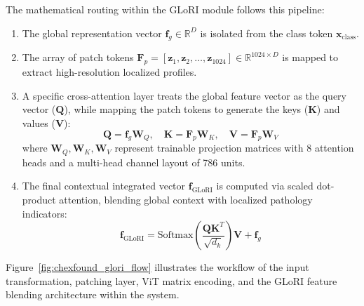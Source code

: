The mathematical routing within the GLoRI module follows this pipeline:
\begin{enumerate}
	\item The global representation vector $\mathbf{f}_g \in \mathbb{R}^D$ is isolated from the class token $\mathbf{x}_{\text{class}}$.
	\item The array of patch tokens $\mathbf{F}_p = [\mathbf{z}_1, \mathbf{z}_2, \dots, \mathbf{z}_1024] \in \mathbb{R}^{1024 \times D}$ is mapped to extract high-resolution localized profiles.
	\item A specific cross-attention layer treats the global feature vector as the query vector ($\mathbf{Q}$), while mapping the patch tokens to generate the keys ($\mathbf{K}$) and values ($\mathbf{V}$):
	\begin{equation}
		\mathbf{Q} = \mathbf{f}_g \mathbf{W}_Q, \quad \mathbf{K} = \mathbf{F}_p \mathbf{W}_K, \quad \mathbf{V} = \mathbf{F}_p \mathbf{W}_V
	\end{equation}
	where $\mathbf{W}_Q, \mathbf{W}_K, \mathbf{W}_V$ represent trainable projection matrices with 8 attention heads and a multi-head channel layout of 786 units.
	
	\item The final contextual integrated vector $\mathbf{f}_{\text{GLoRI}}$ is computed via scaled dot-product attention, blending global context with localized pathology indicators:
	\begin{equation}
		\mathbf{f}_{\text{GLoRI}} = \text{Softmax}\left(\frac{\mathbf{Q}\mathbf{K}^T}{\sqrt{d_k}}\right)\mathbf{V} + \mathbf{f}_g
	\end{equation}
\end{enumerate}

Figure~\ref{fig:chexfound_glori_flow} illustrates the workflow of the input transformation, patching layer, ViT matrix encoding, and the GLoRI feature blending architecture within the system.

